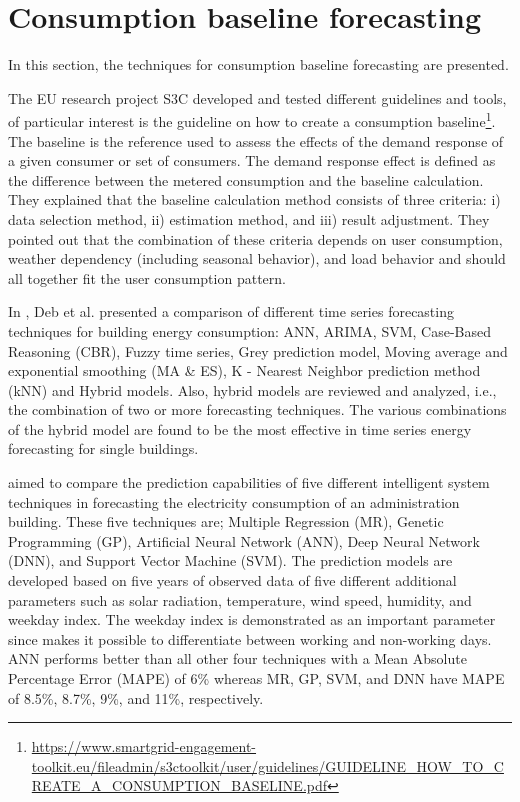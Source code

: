 \section{Consumption baseline forecasting}
\label{sec:baselinesoa}
\vspace{0.2 cm}

In this section, the techniques for consumption baseline forecasting are presented.

The EU research project S3C developed and tested different guidelines and tools, of particular interest is the guideline on how to create a consumption baseline\footnote{ \url{https://www.smartgrid-engagement-toolkit.eu/fileadmin/s3ctoolkit/user/guidelines/GUIDELINE_HOW_TO_CREATE_A_CONSUMPTION_BASELINE.pdf} }.
The baseline is the reference used to assess the effects of the demand response of a given consumer or set of consumers.
The demand response effect is defined as the difference between the metered consumption and the baseline calculation.
They explained that the baseline calculation method consists of three criteria:
i) data selection method,
ii) estimation method,
and iii) result adjustment.
They pointed out that the combination of these criteria depends on user consumption, weather dependency (including seasonal behavior), and load behavior and should all together fit the user consumption pattern.

In \cite{DEB2017902}, Deb et al. presented a comparison of different time series forecasting techniques for building energy consumption: ANN, ARIMA, SVM, Case-Based Reasoning (CBR), Fuzzy time series, Grey prediction model, Moving average and exponential smoothing (MA \& ES), K - Nearest Neighbor prediction method (kNN) and Hybrid models.
Also, hybrid models are reviewed and analyzed, i.e., the combination of two or more forecasting techniques.
The various combinations of the hybrid model are found to be the most effective in time series energy forecasting for single buildings.

\cite{AMBER2018886} aimed to compare the prediction capabilities of five different intelligent system techniques in forecasting the electricity consumption of an administration building.
These five techniques are; Multiple Regression (MR), Genetic Programming (GP), Artificial Neural Network (ANN), Deep Neural Network (DNN), and Support Vector Machine (SVM).
The prediction models are developed based on five years of observed data of five different additional parameters such as solar radiation, temperature, wind speed, humidity, and weekday index.
The weekday index is demonstrated as an important parameter since makes it possible to differentiate between working and non-working days.
ANN performs better than all other four techniques with a Mean Absolute Percentage Error (MAPE) of 6\% whereas MR, GP, SVM, and DNN have MAPE of 8.5\%, 8.7\%, 9\%, and 11\%, respectively.

